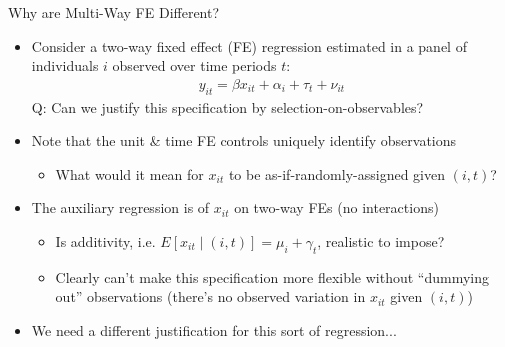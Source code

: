 \documentclass[11pt,english]{beamer}
\begin{document}
\begin{frame}{Why are Multi-Way FE Different?}

\begin{itemize}
\item Consider a two-way fixed effect (FE) regression estimated in a panel of individuals $i$ observed over time periods $t$:
\begin{align*}
y_{it} = \beta x_{it} + \alpha_i + \tau_t + \nu_{it}
\end{align*}\pause{}
Q: Can we justify this specification by selection-on-observables? \bigskip\pause{}

\item Note that the unit \& time FE controls uniquely identify observations  \smallskip\pause{}
\begin{itemize}
\item What would it mean for $x_{it}$ to be as-if-randomly-assigned given $(i,t)$?
\end{itemize}\pause{}
\bigskip

\item The auxiliary regression is of $x_{it}$ on two-way FEs (no interactions)\smallskip
\begin{itemize}
\item Is additivity, i.e.   $E[x_{it}\mid (i,t)]=\mu_i + \gamma_t$, realistic to impose?\smallskip\pause{}
\item Clearly can't make this specification more flexible without ``dummying out'' observations (there's no observed variation in $x_{it}$ given $(i,t)$)
\end{itemize}\medskip\pause{}

\item We need a different justification for this sort of regression...

\end{itemize}


\end{frame}
\end{document}
